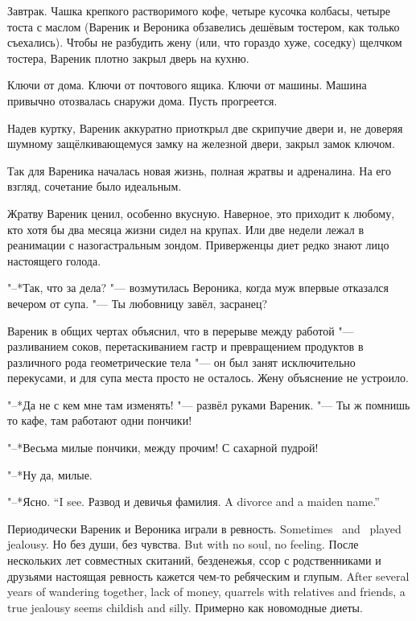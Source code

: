 Завтрак.
Чашка крепкого растворимого кофе, четыре кусочка колбасы, четыре тоста с маслом (Вареник и Вероника обзавелись дешёвым тостером, как только съехались).
Чтобы не разбудить жену (или, что гораздо хуже, соседку) щелчком тостера, Вареник плотно закрыл дверь на кухню.

Ключи от дома.
Ключи от почтового ящика.
Ключи от машины.
Машина привычно отозвалась снаружи дома.
Пусть прогреется.

Надев куртку, Вареник аккуратно приоткрыл две скрипучие двери и, не доверяя шумному защёлкивающемуся замку на железной двери, закрыл замок ключом.

\asterism

Так для Вареника началась новая жизнь, полная жратвы и адреналина.
На его взгляд, сочетание было идеальным.

Жратву Вареник ценил, особенно вкусную.
Наверное, это приходит к любому, кто хотя бы два месяца жизни сидел на крупах.
Или две недели лежал в реанимации с назогастральным зондом.
Приверженцы диет редко знают лицо настоящего голода.

"--*Так, что за дела? "--- возмутилась Вероника, когда муж впервые отказался вечером от супа.
"--- Ты любовницу завёл, засранец?

Вареник в общих чертах объяснил, что в перерыве между работой "--- разливанием соков, перетаскиванием гастр и превращением продуктов в различного рода геометрические тела "--- он был занят исключительно перекусами, и для супа места просто не осталось.
Жену объяснение не устроило.

"--*Да не с кем мне там изменять! "--- развёл руками Вареник.
"--- Ты ж помнишь то кафе, там работают одни пончики!

"--*Весьма милые пончики, между прочим!
С сахарной пудрой!

"--*Ну да, милые.

{"--*Ясно.}
{``I see.}
{Развод и девичья фамилия.}
{A divorce and a maiden name.''}

{Периодически Вареник и Вероника играли в ревность.}
{Sometimes \Varenik\ and \Veronika\ played jealousy.}
{Но без души, без чувства.}
{But with no soul, no feeling.}
{После нескольких лет совместных скитаний, безденежья, ссор с родственниками и друзьями настоящая ревность кажется чем-то ребяческим и глупым.}
{After several years of wandering together, lack of money, quarrels with relatives and friends, a true jealousy seems childish and silly.}
Примерно как новомодные диеты.

